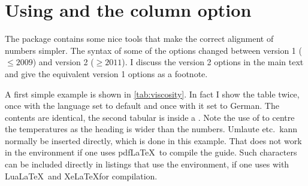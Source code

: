 \section{Using  and the  column option}%
\label{sec:table:siunitx}

The  package contains some nice tools that make the
correct alignment of numbers simpler. The syntax of some of the
options changed between version 1 (\(\leq 2009\)) and version 2 (\(\geq 2011\)). I
discuss the version 2 options in the main text and give the equivalent
version 1 options as a footnote.

A first simple example is shown in \cref{tab:viscosity}.
In fact I show the table twice, once
with the language set to default and once with it set to German. The
 contents are identical, the second tabular is inside a
. Note the use of
to centre the temperatures as the heading is wider than the numbers.
Umlaute etc.\ kann normally be inserted directly,
which is done in this example.
That does not work in the  environment if one uses pdf\LaTeX\ to compile the guide.
Such characters can be included directly in listings that use the  environment,
if one uses  with Lua\LaTeX\ and Xe\LaTeX for compilation.

